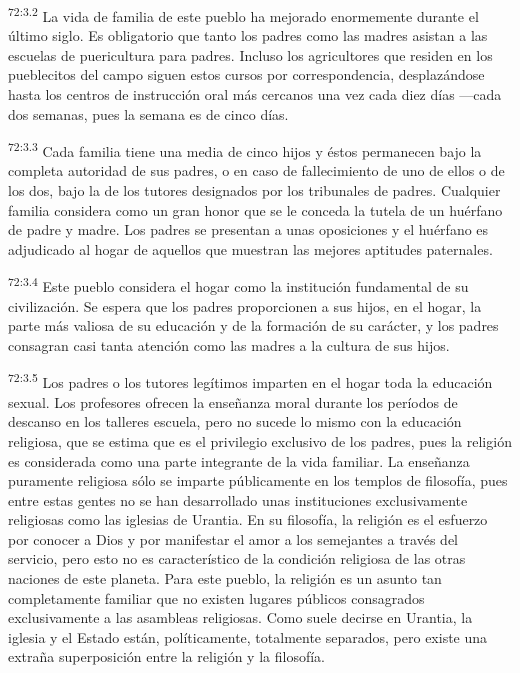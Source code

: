 \documentclass[twoside, 11pt]{book}
\begin{document}
\par
\textsuperscript{72:3.2} La vida de familia de este pueblo ha mejorado enormemente durante el último siglo. Es obligatorio que tanto los padres como las madres asistan a las escuelas de puericultura para padres. Incluso los agricultores que residen en los pueblecitos del campo siguen estos cursos por correspondencia, desplazándose hasta los centros de instrucción oral más cercanos una vez cada diez días ---cada dos semanas, pues la semana es de cinco días.

\par
\textsuperscript{72:3.3} Cada familia tiene una media de cinco hijos y éstos permanecen bajo la completa autoridad de sus padres, o en caso de fallecimiento de uno de ellos o de los dos, bajo la de los tutores designados por los tribunales de padres. Cualquier familia considera como un gran honor que se le conceda la tutela de un huérfano de padre y madre. Los padres se presentan a unas oposiciones y el huérfano es adjudicado al hogar de aquellos que muestran las mejores aptitudes paternales.

\par
\textsuperscript{72:3.4} Este pueblo considera el hogar como la institución fundamental de su civilización. Se espera que los padres proporcionen a sus hijos, en el hogar, la parte más valiosa de su educación y de la formación de su carácter, y los padres consagran casi tanta atención como las madres a la cultura de sus hijos.

\par
\textsuperscript{72:3.5} Los padres o los tutores legítimos imparten en el hogar toda la educación sexual. Los profesores ofrecen la enseñanza moral durante los períodos de descanso en los talleres escuela, pero no sucede lo mismo con la educación religiosa, que se estima que es el privilegio exclusivo de los padres, pues la religión es considerada como una parte integrante de la vida familiar. La enseñanza puramente religiosa sólo se imparte públicamente en los templos de filosofía, pues entre estas gentes no se han desarrollado unas instituciones exclusivamente religiosas como las iglesias de Urantia. En su filosofía, la religión es el esfuerzo por conocer a Dios y por manifestar el amor a los semejantes a través del servicio, pero esto no es característico de la condición religiosa de las otras naciones de este planeta. Para este pueblo, la religión es un asunto tan completamente familiar que no existen lugares públicos consagrados exclusivamente a las asambleas religiosas. Como suele decirse en Urantia, la iglesia y el Estado están, políticamente, totalmente separados, pero existe una extraña superposición entre la religión y la filosofía.
\end{document}
